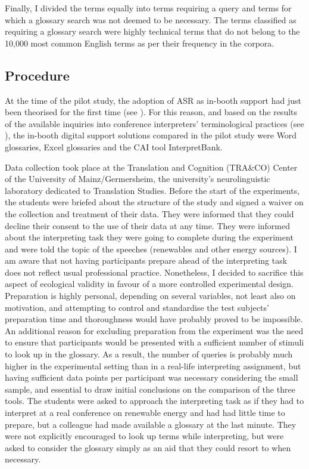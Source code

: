 Finally, I divided the terms equally into terms requiring a query and terms for which a glossary search was not deemed to be necessary. The terms classified as requiring a glossary search were highly technical terms that do not belong to the 10,000 most common English terms as per their frequency in the \citet{eng_web_2012,eng_news_2016,eng_wikipedia_2021} corpora.


\subsection{Procedure} \label{procedure_PS}
At the time of the pilot study, the adoption of ASR as in-booth support had just been theorised for the first time (see \citealt{fantinuoli_speech_2017,ortiz_computer-assisted_2018}). For this reason, and based on the results of the available inquiries into conference interpreters' terminological practices (see ), the in-booth digital support solutions compared in the pilot study were Word glossaries, Excel glossaries and the CAI tool InterpretBank.


Data collection took place at the Translation and Cognition (TRA\&CO) Center of the University of Mainz/Germersheim, the university's neurolinguistic laboratory dedicated to Translation Studies. Before the start of the experiments, the students were briefed about the structure of the study and signed a waiver on the collection and treatment of their data. They were informed that they could decline their consent to the use of their data at any time. They were informed about the interpreting task they were going to complete during the experiment and were told the topic of the speeches (renewables and other energy sources). I am aware that not having participants prepare ahead of the interpreting task does not reflect usual professional practice. Nonetheless, I decided to sacrifice this aspect of ecological validity in favour of a more controlled experimental design. Preparation is highly personal, depending on several variables, not least also on motivation, and attempting to control and standardise the test subjects' preparation time and thoroughness would have probably proved to be impossible. An additional reason for excluding preparation from the experiment was the need to ensure that participants would be presented with a sufficient number of stimuli to look up in the glossary. As a result, the number of queries is probably much higher in the experimental setting than in a real-life interpreting assignment, but having sufficient data points per participant was necessary considering the small sample, and essential to draw initial conclusions on the comparison of the three tools. The students were asked to approach the interpreting task as if they had to interpret at a real conference on renewable energy and had had little time to prepare, but a colleague had made available a glossary at the last minute. They were not explicitly encouraged to look up terms while interpreting, but were asked to consider the glossary simply as an aid that they could resort to when necessary.

